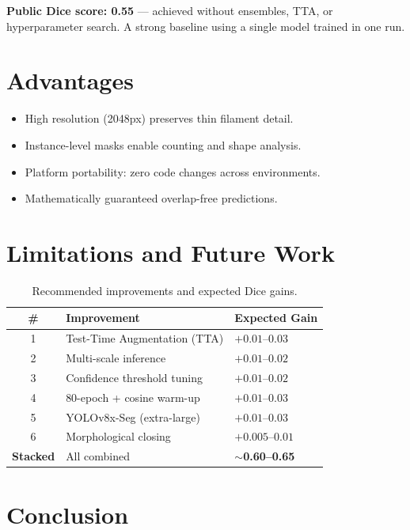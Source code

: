 \documentclass[12pt,a4paper,openany]{report}
\begin{document}
\textbf{Public Dice score: 0.55} --- achieved without ensembles, TTA, or hyperparameter
search. A strong baseline using a single model trained in one run.

\section{Advantages}

\begin{itemize}
  \item High resolution (2048px) preserves thin filament detail.
  \item Instance-level masks enable counting and shape analysis.
  \item Platform portability: zero code changes across environments.
  \item Mathematically guaranteed overlap-free predictions.
\end{itemize}

\section{Limitations and Future Work}

\begin{table}[H]
\centering
\caption{Recommended improvements and expected Dice gains.}
\renewcommand{\arraystretch}{1.3}
\begin{tabular}{c l l}
\toprule
\textbf{\#} & \textbf{Improvement} & \textbf{Expected Gain} \\
\midrule
1 & Test-Time Augmentation (TTA)    & $+0.01$--$0.03$ \\
2 & Multi-scale inference           & $+0.01$--$0.02$ \\
3 & Confidence threshold tuning     & $+0.01$--$0.02$ \\
4 & 80-epoch + cosine warm-up       & $+0.01$--$0.03$ \\
5 & YOLOv8x-Seg (extra-large)       & $+0.01$--$0.03$ \\
6 & Morphological closing           & $+0.005$--$0.01$ \\
\midrule
\textbf{Stacked} & All combined & $\sim$\textbf{0.60--0.65} \\
\bottomrule
\end{tabular}
\label{tab:future}
\end{table}

\section{Conclusion}
\end{document}
